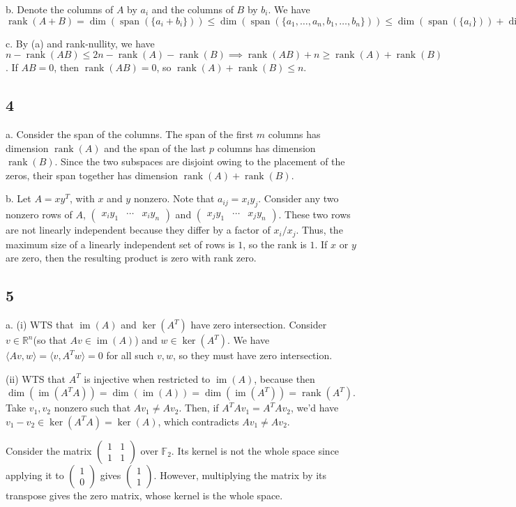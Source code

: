 \documentclass{article}
\newcommand{\openm}{\begin{pmatrix}}
\newcommand{\closem}{\end{pmatrix}}
\DeclareMathOperator{\rank}{rank}
\DeclareMathOperator{\im}{im}
\DeclareMathOperator{\Span}{span}
\newcommand{\rn}{\mathbb{R}}
\begin{document}
\noindent b. Denote the columns of $A$ by $a_i$ and the columns of $B$ by $b_i$. We have $\rank(A+B)=\dim(\Span(\{a_i+b_i\}))\leq\dim(\Span(\{a_1,\ldots,a_n,b_1,\ldots,b_n\}))\leq\dim(\Span(\{a_i\}))+\dim(\Span(\{b_i\}))$

\noindent c. By (a) and rank-nullity, we have $n-\rank(AB)\leq2n-\rank(A)-\rank(B)\implies\rank(AB)+n\geq\rank(A)+\rank(B)$. If $AB=0$, then $\rank(AB)=0$, so $\rank(A)+\rank(B)\leq n$.

\subsection*{4}
a. Consider the span of the columns. The span of the first $m$ columns has dimension $\rank(A)$ and the span of the last $p$ columns has dimension $\rank(B)$. Since the two subspaces are disjoint owing to the placement of the zeros, their span together has dimension $\rank(A)+\rank(B)$.

\noindent b. Let $A=xy^T$, with $x$ and $y$ nonzero. Note that $a_{ij}=x_iy_j$. Consider any two nonzero rows of $A$, $\openm x_iy_1&\cdots&x_iy_n\closem$ and $\openm x_jy_1&\cdots&x_jy_n\closem$. These two rows are not linearly independent because they differ by a factor of $x_i/x_j$. Thus, the maximum size of a linearly independent set of rows is $1$, so the rank is $1$. If $x$ or $y$ are zero, then the resulting product is zero with rank zero.

\subsection*{5}
a. (i) WTS that $\im(A)$ and $\ker(A^T)$ have zero intersection. Consider $v\in\rn^n$(so that $Av\in\im(A)$) and $w\in\ker(A^T)$. We have $\langle Av,w\rangle=\langle v,A^Tw\rangle=0$ for all such $v,w$, so they must have zero intersection. 

(ii) WTS that $A^T$ is injective when restricted to $\im(A)$, because then $\dim(\im(A^TA))=\dim(\im(A))=\dim(\im(A^T))=\rank(A^T)$. Take $v_1,v_2$ nonzero such that $Av_1\neq Av_2$. Then, if $A^TAv_1=A^TAv_2$, we'd have $v_1-v_2\in\ker(A^TA)=\ker(A)$, which contradicts $Av_1\neq Av_2$. 

Consider the matrix $\openm1&1\\1&1\closem$ over $\mathbb{F}_2$. Its kernel is not the whole space since applying it to $\openm1\\0\closem$ gives $\openm1\\1\closem$. However, multiplying the matrix by its transpose gives the zero matrix, whose kernel is the whole space.
\end{document}
